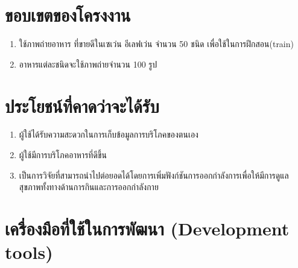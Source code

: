 

\newpage

\section{ขอบเขตของโครงงาน}
\begin{enumerate}
	\item ใช้ภาพถ่ายอาหาร ที่ขายดีในเซเว่น อีเลฟเว่น จำนวน 50 ชนิด เพื่อใช้ในการฝึกสอน(train)
		\item อาหารแต่ละชนิดจะใช้ภาพถ่ายจำนวน 100 รูป 
\end{enumerate}
\section{ประโยชน์ที่คาดว่าจะได้รับ}
\begin{enumerate}
	\item ผู้ใช้ได้รับความสะดวกในการเก็บข้อมูลการบริโภคของตนเอง 
	\item ผู้ใช้มีการบริโภคอาหารที่ดีขึ้น
  \item เป็นการวิจัยที่สามารถนำไปต่อยอดได้โดยการเพิ่มฟังก์ชันการออกกำลังการเพื่อให้มีการดูแลสุขภาพทั้งทางด้านการกินและการออกกำลังกาย 
\end{enumerate}
\section{เครื่องมือที่ใช้ในการพัฒนา (Development tools)}
